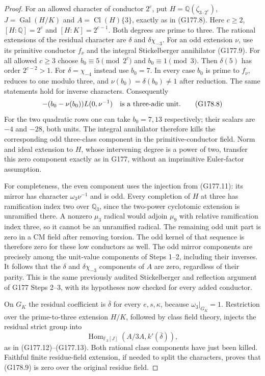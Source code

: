 \begin{proof}
For an allowed character of conductor $2^c$, put
$H=\mathbb Q(\zeta_{3\cdot2^c})$, $J=\operatorname{Gal}(H/K)$ and
$A=\operatorname{Cl}(H)\{3\}$, exactly as in (G177.8).
Here $c\geq2$, $[H:\mathbb Q]=2^c$ and $[H:K]=2^{c-1}$.
Both degrees are prime to three.
The rational extensions of the residual character are $\delta$
and $\delta\chi_{-3}$.
For an odd extension $\nu$, use its primitive conductor $f_\nu$
and the integral Stickelberger annihilator (G177.9).
For all allowed $c\geq3$ choose
$b_0\equiv5\pmod{2^c}$ and $b_0\equiv1\pmod3$.
Then $\delta(5)$ has order $2^{c-2}>1$.
For $\delta=\chi_{-4}$ instead use $b_0=7$.
In every case $b_0$ is prime to $f_\nu$, reduces to one modulo three,
and $\nu(b_0)=\delta(b_0)\ne1$ after reduction.
The same statements hold for inverse characters.
Consequently
\[
             -(b_0-\nu(b_0))L(0,\nu^{-1})
                         \quad\hbox{is a three-adic unit}.
 \tag{G178.8}
\]
For the two quadratic rows one can take $b_0=7,13$ respectively;
their scalars are $-4$ and $-28$, both units.
The integral annihilator therefore kills the corresponding odd
three-class component in the primitive-conductor field.
Norm and ideal extension to $H$, whose intervening degree is a
power of two, transfer this zero component exactly as in G177,
without an imprimitive Euler-factor assumption.

For completeness, the even component uses the injection from
(G177.11): its mirror has character $\omega_3\nu^{-1}$ and is odd.
Every completion of $H$ at three has ramification index two over
$\mathbb Q_3$, since the two-power cyclotomic extension is unramified
there.  A nonzero $\mu_3$ radical would adjoin $\mu_9$ with relative
ramification index three, so it cannot be an unramified radical.
The remaining odd unit part is zero in a CM field after removing
torsion.  The odd kernel of that sequence is therefore zero for these
low conductors as well.
The odd mirror components are precisely among the unit-value
components of Steps 1--2, including their inverses.
It follows that the $\delta$ and $\delta\chi_{-3}$ components of
$A$ are zero, regardless of their parity.
This is the same previously audited Stickelberger and reflection
argument of G177 Steps 2--3, with its hypotheses now checked for
every added conductor.

On $G_K$ the residual coefficient is $\overline\delta$ for every
$e,s,\kappa$, because $\omega_3|_{G_K}=1$.
Restriction over the prime-to-three extension $H/K$, followed by
class field theory, injects the residual strict group into
\[
  \operatorname{Hom}_{\mathbb F_3[J]}
                  (A/3A,k'(\overline\delta)),
 \tag{G178.9}
\]
as in (G177.12)--(G177.13).
Both rational class components have just been killed.
Faithful finite residue-field extension, if needed to split the
characters, proves that (G178.9) is zero over the original residue field.


\end{proof}
